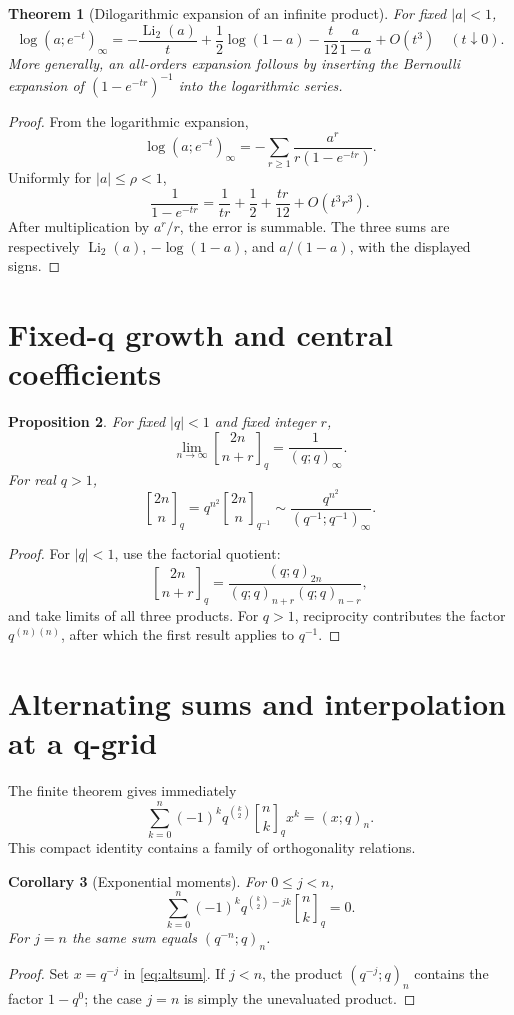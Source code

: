 \documentclass[11pt]{article}
\numberwithin{equation}{section}
\newtheorem{theorem}{Theorem}[section]
\newtheorem{proposition}[theorem]{Proposition}
\newtheorem{corollary}[theorem]{Corollary}
\theoremstyle{definition}
\newcommand{\qbinom}[2]{\genfrac{[}{]}{0pt}{}{#1}{#2}_{q}}
\newcommand{\Li}{\operatorname{Li}}
\begin{document}
\begin{theorem}[Dilogarithmic expansion of an infinite product]
For fixed $|a|<1$,
\[
\log(a;e^{-t})_\infty
=-\frac{\Li_2(a)}t+\frac12\log(1-a)
-\frac{t}{12}\frac{a}{1-a}+O(t^3)
\quad(t\downarrow0).
\]
More generally, an all-orders expansion follows by inserting the Bernoulli expansion of $(1-e^{-tr})^{-1}$ into the logarithmic series.
\end{theorem}
\begin{proof}
From the logarithmic expansion,
\[
\log(a;e^{-t})_\infty=-\sum_{r\ge1}\frac{a^r}{r(1-e^{-tr})}.
\]
Uniformly for $|a|\le\rho<1$,
\[
\frac1{1-e^{-tr}}=\frac1{tr}+\frac12+\frac{tr}{12}+O(t^3r^3).
\]
After multiplication by $a^r/r$, the error is summable.  The three sums are respectively $\Li_2(a)$, $-\log(1-a)$, and $a/(1-a)$, with the displayed signs.
\end{proof}

\section{Fixed-q growth and central coefficients}
\begin{proposition}
For fixed $|q|<1$ and fixed integer $r$,
\[
\lim_{n\to\infty}\genfrac{[}{]}{0pt}{}{2n}{n+r}_q=\frac1{(q;q)_\infty}.
\]
For real $q>1$,
\[
\genfrac{[}{]}{0pt}{}{2n}{n}_q
=q^{n^2}\genfrac{[}{]}{0pt}{}{2n}{n}_{q^{-1}}
\sim \frac{q^{n^2}}{(q^{-1};q^{-1})_\infty}.
\]
\end{proposition}
\begin{proof}
For $|q|<1$, use the factorial quotient:
\[
\genfrac{[}{]}{0pt}{}{2n}{n+r}_q
=\frac{(q;q)_{2n}}{(q;q)_{n+r}(q;q)_{n-r}},
\]
and take limits of all three products.  For $q>1$, reciprocity contributes the factor $q^{(n)(n)}$, after which the first result applies to $q^{-1}$.
\end{proof}

\section{Alternating sums and interpolation at a q-grid}
The finite theorem gives immediately
\begin{equation}
\sum_{k=0}^{n}(-1)^kq^{\binom k2}\qbinom nk x^k=(x;q)_n.
\label{eq:altsum}
\end{equation}
This compact identity contains a family of orthogonality relations.

\begin{corollary}[Exponential moments]
For $0\le j<n$,
\[
\sum_{k=0}^{n}(-1)^kq^{\binom k2-jk}\qbinom nk=0.
\]
For $j=n$ the same sum equals $(q^{-n};q)_n$.
\end{corollary}
\begin{proof}
Set $x=q^{-j}$ in \eqref{eq:altsum}.  If $j<n$, the product $(q^{-j};q)_n$ contains the factor $1-q^0$; the case $j=n$ is simply the unevaluated product.
\end{proof}
\end{document}
